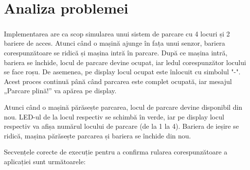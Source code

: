\documentclass[a4paper,11pt]{report}
\begin{document}
\chapter{Analiza problemei}\label{chap:analiza}  

\paragraph{}

\color{black} Implementarea are ca scop simularea unui sistem de parcare cu 4 locuri și 2 bariere de acces. Atunci când o mașină ajunge în fața unui senzor, bariera corespunzătoare se ridică și mașina intră în parcare. După ce mașina intră, bariera se închide, locul de parcare devine ocupat, iar ledul corespunzător locului se face roșu. De asemenea, pe display locul ocupat este înlocuit cu simbolul "-". Acest proces continuă până când parcarea este complet ocupată, iar mesajul „Parcare plină!” va apărea pe display.

Atunci când o mașină părăsește parcarea, locul de parcare devine disponibil din nou. LED-ul de la locul respectiv se schimbă în verde, iar pe display locul respectiv va afișa numărul locului de parcare (de la 1 la 4). Bariera de ieșire se ridică, mașina părăsește parcarea și bariera se închide din nou.

\noindent Secvențele corecte de execuție pentru a confirma rularea corespunzătoare a aplicației sunt următoarele:
\end{document}
